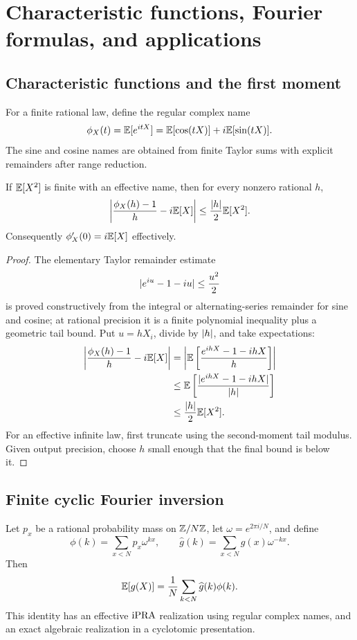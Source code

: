 \section{Characteristic functions, Fourier formulas, and applications}\label{sec:fourier}

\subsection{Characteristic functions and the first moment}

For a finite rational law, define the regular complex name
\[
 \phi_X(t)=\mathbb E[e^{itX}]
 =\mathbb E[\cos(tX)]+i\mathbb E[\sin(tX)].
\]
The sine and cosine names are obtained from finite Taylor sums with explicit
remainders after range reduction.

\begin{theorem}
\label{thm:char-derivative}
If \(\mathbb E[X^2]\) is finite with an effective name, then for every nonzero
rational \(h\),
\[
 \left|\frac{\phi_X(h)-1}{h}-i\mathbb E[X]\right|
 \le\frac{\lvert h\rvert}{2}\mathbb E[X^2].
\]
Consequently \(\phi_X'(0)=i\mathbb E[X]\) effectively.
\end{theorem}

\begin{proof}
The elementary Taylor remainder estimate
\[
 \lvert e^{iu}-1-iu\rvert\le\frac{u^2}{2}
\]
is proved constructively from the integral or alternating-series remainder for
sine and cosine; at rational precision it is a finite polynomial inequality
plus a geometric tail bound.  Put \(u=hX_i\), divide by \(\lvert h\rvert\), and take
expectations:
\begin{align*}
\left|\frac{\phi_X(h)-1}{h}-i\mathbb E[X]\right|
&=\left|\mathbb E\left[\frac{e^{ihX}-1-ihX}{h}\right]\right|\\
&\le\mathbb E\left[\frac{\lvert e^{ihX}-1-ihX\rvert}{\lvert h\rvert}\right]\\
&\le\frac{\lvert h\rvert}{2}\mathbb E[X^2].
\end{align*}
For an effective infinite law, first truncate using the second-moment tail
modulus.  Given output precision, choose \(h\) small enough that the final
bound is below it.
\end{proof}

\subsection{Finite cyclic Fourier inversion}

\begin{theorem}\label{thm:finite-fourier}
Let \(p_x\) be a rational probability mass on \(\mathbb Z/N\mathbb Z\), let
\(\omega=e^{2\pi i/N}\), and define
\[
 \phi(k)=\sum_{x<N}p_x\omega^{kx},\qquad
 \widehat g(k)=\sum_{x<N}g(x)\omega^{-kx}.
\]
Then
\[
 \mathbb E[g(X)]=\frac1N\sum_{k<N}\widehat g(k)\phi(k).
\]
This identity has an effective \(\mathrm{iPRA}\) realization using regular complex
names, and an exact algebraic realization in a cyclotomic presentation.
\end{theorem}

